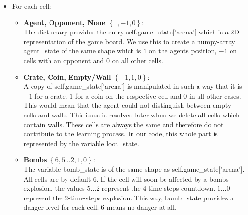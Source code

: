 \documentclass[12pt]{report}
\newcommand{\code}[1]{{\fontfamily{pcr}\selectfont #1}}
\newcommand{\state}[1]{$\left\lbrace #1 \right\rbrace$}
\begin{document}
	\begin{itemize}
		\item For each cell:
		\begin{itemize}
			\item \textbf{Agent, Opponent, None \state{1,-1,0}}:\\
			The dictionary provides the entry \code{self.game\_state['arena']} which is a 2D representation of the game board. We use this to create a numpy-array \code{agent\_state} of the same shape which is $1$ on the agents position, $-1$ on cells with an opponent and $0$ on all other cells.
			\item \textbf{Crate, Coin, Empty/Wall \state{-1,1,0}}: \\
			A copy of \code{self.game\_state['arena']} is manipulated in such a way that it is $-1$ for a crate, $1$ for a coin on the respective cell and $0$ in all other cases. This would mean that the agent could not distinguish between empty cells and walls. This issue is resolved later when we delete all cells which contain walls. These cells are always the same and therefore do not contribute to the learning process. In our code, this whole part is represented by the variable \code{loot\_state}.
			\item \textbf{Bombs} \state{6,5 \dots 2,1,0}:\\
			The variable \code{bomb\_state} is of the same shape as \code{self.game\_state['arena']}. All cells are by default $6$. If the cell will soon be affected by a bombs explosion, the values $5\dots2$ represent the 4-time-steps countdown. $1\dots0$ represent the 2-time-steps explosion. This way, \code{bomb\_state} provides a danger level for each cell. $6$ means no danger at all.
			

\end{itemize}
\end{itemize}
\end{document}
